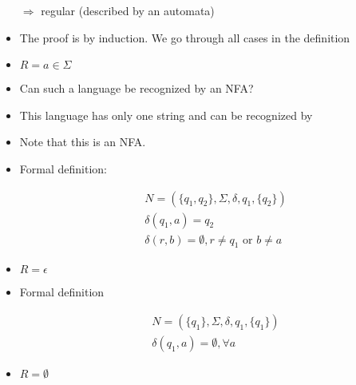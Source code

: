 \begin{frame}[allowframebreaks]
\begin{itemize}
$\Rightarrow$ regular (described by an automata)
\item The proof is by induction. We go through all cases in the
  definition
\item $R = a \in \Sigma$
\item [] Can such a language be recognized by an NFA?
\item [] This language has only one string and can be recognized by

\begin{center}
\end{center}

\item[] Note that this is an NFA. 
\item[] Formal definition:

  \begin{equation*}
    \begin{split}
& N = (\{q_1,q_2\}, \Sigma, \delta, q_1, \{q_2\}) \\
& \delta(q_1,a)=q_2 \\
& \delta(r,b)=\emptyset, r \neq q_1\mbox{ or } b \neq a
\end{split}
\end{equation*}
\item $R=\epsilon$

\begin{center}
\end{center}
  
\item [] Formal definition

  \begin{equation*}
    \begin{split}
& N=(\{q_1\},\Sigma,\delta, q_1, \{q_1\}) \\
& \delta(q_1,a)=\emptyset, \forall a
\end{split}
\end{equation*}

\item $R=\emptyset$

\begin{center}
\end{center}
  

\end{itemize}
\end{frame}
